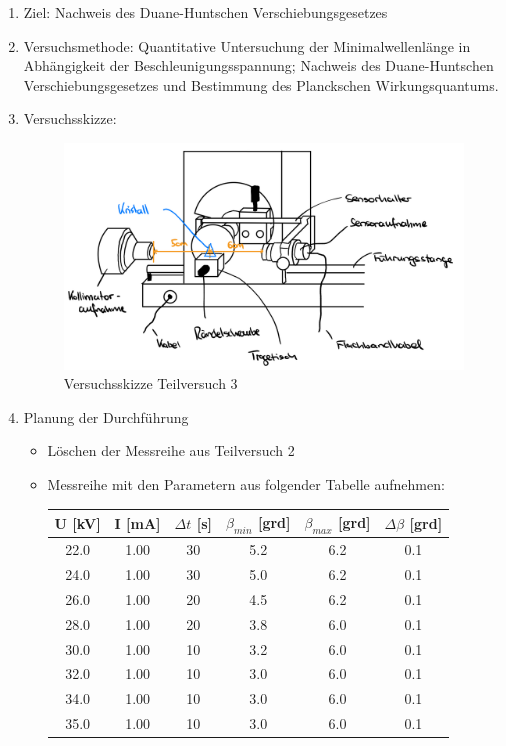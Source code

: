 \documentclass{article}
\begin{document}
\begin{enumerate}[label = (\Roman*)]
    \item Ziel: Nachweis des Duane-Huntschen Verschiebungsgesetzes
    
    \item Versuchsmethode: Quantitative Untersuchung der Minimalwellenlänge in Abhängigkeit der Beschleunigungsspannung; Nachweis des Duane-Huntschen Verschiebungsgesetzes und Bestimmung des Planckschen Wirkungsquantums.
    
    \item Versuchsskizze:
    
        \begin{figure}[H]
        \centering
        \includegraphics[width=0.7\linewidth]{Abbildungen/Aufbau Bragg Versuche.jpeg}
        \caption{Versuchsskizze Teilversuch 3}
        \end{figure}

    \item Planung der Durchführung
        \begin{itemize}
            \item Löschen der Messreihe aus Teilversuch 2
            \item Messreihe mit den Parametern aus folgender Tabelle aufnehmen:

            \begin{center}
                \begin{tabular}{ |c|c|c|c|c|c| } 
                 \hline
                 U [kV] & I [mA] & $\Delta t $ [s] & $\beta_{min}$ [grd] & $\beta_{max}$ [grd] & $\Delta\beta$ [grd] \\ 
                 \hline
                 22.0 & 1.00 & 30 & 5.2 & 6.2 & 0.1 \\ 
                 24.0 & 1.00 & 30 & 5.0 & 6.2 & 0.1 \\
                 26.0 & 1.00 & 20 & 4.5 & 6.2 & 0.1 \\
                 28.0 & 1.00 & 20 & 3.8 & 6.0 & 0.1 \\
                 30.0 & 1.00 & 10 & 3.2 & 6.0 & 0.1 \\
                 32.0 & 1.00 & 10 & 3.0 & 6.0 & 0.1 \\
                 34.0 & 1.00 & 10 & 3.0 & 6.0 & 0.1 \\
                 35.0 & 1.00 & 10 & 3.0 & 6.0 & 0.1 \\
                 \hline
                \end{tabular}
            \end{center}


\end{itemize}
\end{enumerate}
\end{document}
